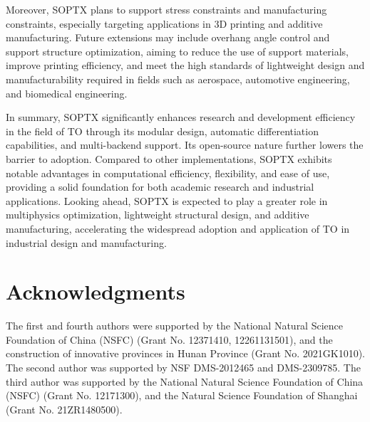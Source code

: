 \documentclass[mathpazo]{cicp}
\begin{document}
Moreover, SOPTX plans to support stress constraints and manufacturing constraints, especially targeting applications in 3D printing and additive manufacturing. Future extensions may include overhang angle control and support structure optimization, aiming to reduce the use of support materials, improve printing efficiency, and meet the high standards of lightweight design and manufacturability required in fields such as aerospace, automotive engineering, and biomedical engineering.

In summary, SOPTX significantly enhances research and development efficiency in the field of TO through its modular design, automatic differentiation capabilities, and multi-backend support. Its open-source nature further lowers the barrier to adoption. Compared to other implementations, SOPTX exhibits notable advantages in computational efficiency, flexibility, and ease of use, providing a solid foundation for both academic research and industrial applications. Looking ahead, SOPTX is expected to play a greater role in multiphysics optimization, lightweight structural design, and additive manufacturing, accelerating the widespread adoption and application of TO in industrial design and manufacturing.

\section*{Acknowledgments}
The first and fourth authors were supported by the National Natural Science
Foundation of China (NSFC) (Grant No. 12371410, 12261131501), and the
construction of innovative provinces in Hunan Province (Grant No. 2021GK1010).
The second author was supported by NSF DMS-2012465 and DMS-2309785. The third
author was supported by the National Natural Science Foundation of China (NSFC)
(Grant No. 12171300), and the Natural Science Foundation of Shanghai (Grant No.
21ZR1480500).

\appendix
\renewcommand{\thesection}{Appendix\,\Alph{section}}
\end{document}
